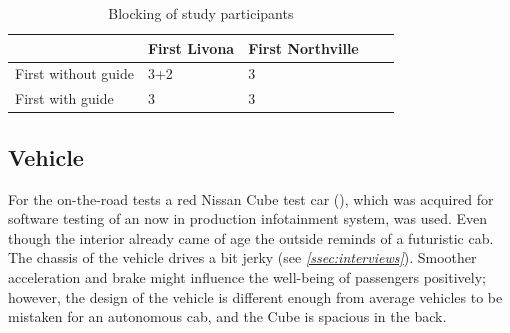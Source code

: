 \begin{table}
  \caption{Blocking of study participants}
  \label{tab:blocking}

\begin{tabular}{@{}l|llll@{}}
\toprule
                    & First Livona & First Northville &  &  \\ \midrule
First without guide & 3+2          & 3                &  &  \\
First with guide    & 3            & 3                &  & 
\end{tabular}
\end{table}

\subsection{Vehicle}
For the on-the-road tests a red Nissan Cube test car (\emph{}), which was acquired for software testing of an now in production infotainment system, was used. Even though the interior already came of age the outside reminds of a futuristic cab. The chassis of the vehicle drives a bit jerky (see \emph{\ref{ssec:interviews}}). Smoother acceleration and brake might influence the well-being of passengers positively; however, the design of the vehicle is different enough from average vehicles to be mistaken for an autonomous cab, and the Cube is spacious in the back. 

